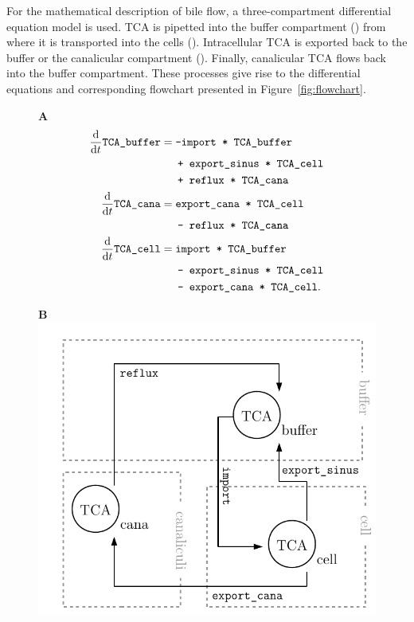 \documentclass[article]{jss}
\begin{document}
For the mathematical description of bile flow, a three-compartment differential equation model is used. TCA is pipetted into the buffer compartment () from where it is transported into the cells (). Intracellular TCA is exported back to the buffer or the canalicular compartment (). Finally, canalicular TCA flows back into the buffer compartment. These processes give rise to the differential equations and corresponding flowchart presented in Figure~\ref{fig:flowchart}.
\begin{figure}[ht]
	\centering
	\begin{minipage}{0.55\textwidth}
		\textbf{A}
		\begin{equation*}
			\begin{aligned}
				\frac{\rm d}{ {\rm d}t} \verb!TCA_buffer! &= \verb!-import * TCA_buffer!\\
				& \quad \verb! + export_sinus * TCA_cell!\\
				& \quad \verb! + reflux * TCA_cana!\\
				\frac{\rm d}{ {\rm d}t} \verb!TCA_cana! &= \verb!export_cana * TCA_cell!\\
				& \quad \verb! - reflux * TCA_cana!\\
				\frac{\rm d}{ {\rm d}t} \verb!TCA_cell! &= \verb!import * TCA_buffer!\\
				& \quad \verb! - export_sinus * TCA_cell!\\
				&\quad \verb! - export_cana * TCA_cell!.
			\end{aligned}
		\end{equation*}
	\end{minipage}
	\begin{minipage}{0.44\textwidth}
		\textbf{B}\\
	\includegraphics[width = \textwidth]{images/flowchart}

\end{minipage}
\end{figure}
\end{document}
